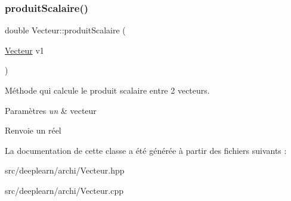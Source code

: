 \subsubsection{\texorpdfstring{produit\+Scalaire()}{produitScalaire()}}
{\footnotesize\ttfamily double Vecteur\+::produit\+Scalaire (\begin{DoxyParamCaption}\item[{\hyperlink{class_vecteur}{Vecteur}}]{v1 }\end{DoxyParamCaption})}



Méthode qui calcule le produit scalaire entre 2 vecteurs. 


\begin{DoxyParams}{Paramètres}
{\em un} & vecteur \\
\hline
\end{DoxyParams}
\begin{DoxyReturn}{Renvoie}
un réel 
\end{DoxyReturn}


La documentation de cette classe a été générée à partir des fichiers suivants \+:\begin{DoxyCompactItemize}
\item 
src/deeplearn/archi/Vecteur.\+hpp\item 
src/deeplearn/archi/Vecteur.\+cpp\end{DoxyCompactItemize}

